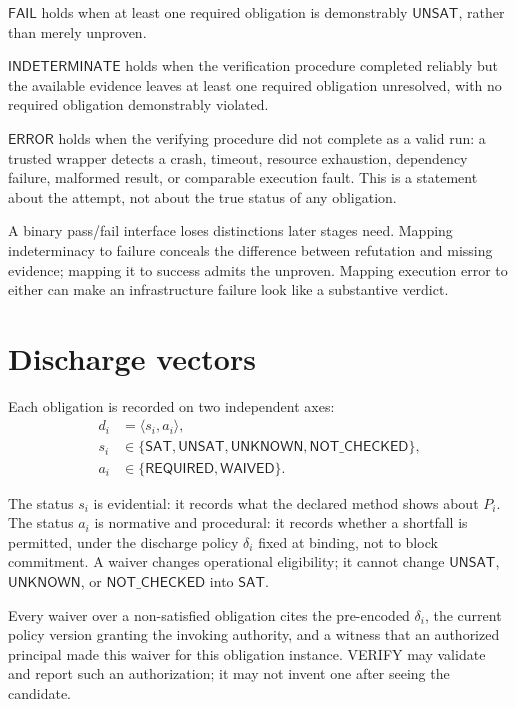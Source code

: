 \documentclass[11pt,openany]{book}
\newcommand{\Fail}{\mathsf{FAIL}}
\newcommand{\Indeterminate}{\mathsf{INDETERMINATE}}
\newcommand{\ErrorVerdict}{\mathsf{ERROR}}
\newcommand{\Waived}{\mathsf{WAIVED}}
\newcommand{\Required}{\mathsf{REQUIRED}}
\begin{document}
\(\Fail\) holds when at least one required obligation is demonstrably
\(\mathsf{UNSAT}\), rather than merely unproven.

\(\Indeterminate\) holds when the verification procedure completed reliably
but the available evidence leaves at least one required obligation unresolved,
with no required obligation demonstrably violated.

\(\ErrorVerdict\) holds when the verifying procedure did not complete as a
valid run: a trusted wrapper detects a crash, timeout, resource exhaustion,
dependency failure, malformed result, or comparable execution fault. This is a
statement about the attempt, not about the true status of any obligation.

A binary pass/fail interface loses distinctions later stages need. Mapping
indeterminacy to failure conceals the difference between refutation and missing
evidence; mapping it to success admits the unproven. Mapping execution error to
either can make an infrastructure failure look like a substantive verdict.

\section{Discharge vectors}

Each obligation is recorded on two independent axes:
\[
\begin{aligned}
 d_i&=\langle s_i,a_i\rangle,\\
 s_i&\in\{\mathsf{SAT},\mathsf{UNSAT},\mathsf{UNKNOWN},
                 \mathsf{NOT\_CHECKED}\},\\
 a_i&\in\{\Required,\Waived\}.
\end{aligned}
\]

The status \(s_i\) is evidential: it records what the declared method shows
about \(P_i\). The status \(a_i\) is normative and procedural: it records
whether a shortfall is permitted, under the discharge policy \(\delta_i\)
fixed at binding, not to block commitment. A waiver changes operational
eligibility; it cannot change \(\mathsf{UNSAT}\), \(\mathsf{UNKNOWN}\), or
\(\mathsf{NOT\_CHECKED}\) into \(\mathsf{SAT}\).

Every waiver over a non-satisfied obligation cites the pre-encoded
\(\delta_i\), the current policy version granting the invoking authority, and
a witness that an authorized principal made this waiver for this obligation
instance. VERIFY may validate and report such an authorization; it may not
invent one after seeing the candidate.
\end{document}
